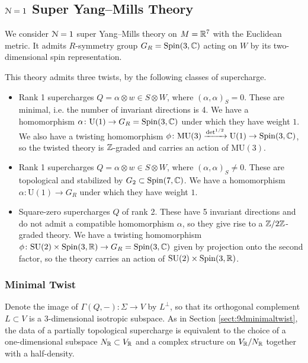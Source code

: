 \documentclass[10pt, oneside]{article}
\newcommand{\MU}{\mathrm{MU}}
\renewcommand{\U}{\mathrm{U}}
\begin{document}
\subsection{\texorpdfstring{$\mathcal N=1$}{N=1} Super Yang--Mills Theory}

We consider $\mathcal N=1$ super Yang--Mills theory on $M=\mathbb R^7$ with the Euclidean metric. It admits $R$-symmetry group $G_R=\mathrm{Spin}(3, \mathbb C)$ acting on $W$ by its two-dimensional spin representation.

This theory admits three twists, by the following classes of supercharge.
\begin{itemize}
\item Rank 1 supercharges $Q=\alpha\otimes w\in S\otimes W$, where $(\alpha, \alpha)_S = 0$. These are minimal, i.e. the number of invariant directions is 4. We have a homomorphism $\alpha\colon \U(1)\rightarrow G_R=\Spin(3, \CC)$ under which they have weight $1$. We also have a twisting homomorphism $\phi\colon \MU(3)\xrightarrow{\det^{1/2}} \U(1)\rightarrow \Spin(3, \CC)$, so the twisted theory is $\mathbb Z$-graded and carries an action of $\MU(3)$.

\item Rank 1 supercharges $Q = \alpha \otimes w \in S \otimes W$, where $(\alpha, \alpha)_S\neq 0$. These are topological and stabilized by $G_2\subset \mathrm{Spin}(7, \mathbb C)$. We have a homomorphism $\alpha\colon \U(1)\rightarrow G_R$ under which they have weight $1$.

\item Square-zero supercharges $Q$ of rank 2. These have 5 invariant directions and do not admit a compatible homomorphism $\alpha$, so they give rise to a $\mathbb Z/2\mathbb Z$-graded theory. We have a twisting homomorphism $\phi\colon \mathrm{SU}(2)\times \mathrm{Spin}(3, \mathbb R)\rightarrow G_R=\mathrm{Spin}(3, \mathbb C)$ given by projection onto the second factor, so the theory carries an action of $\mathrm{SU}(2)\times\mathrm{Spin}(3, \mathbb R)$.
\end{itemize}

\subsubsection{Minimal Twist}
\label{sect:7dminimaltwist}

Denote the image of $\Gamma(Q, -)\colon \Sigma\rightarrow V$ by $L^\perp$, so that its orthogonal complement $L\subset V$ is a 3-dimensional isotropic subspace. As in Section \ref{sect:9dminimaltwist}, the data of a partially topological supercharge is equivalent to the choice of a one-dimensional subspace $N_\mathbb R\subset V_\mathbb R$ and a complex structure on $V_\mathbb R/N_\mathbb R$ together with a half-density.
\end{document}
